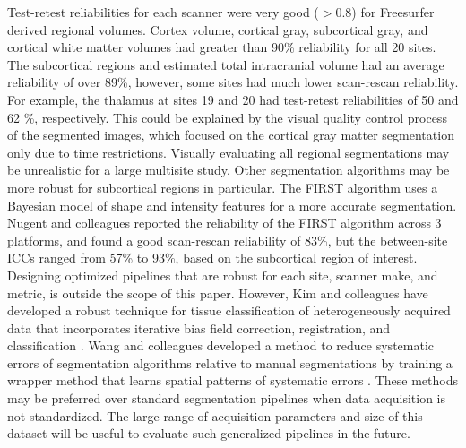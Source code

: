 Test-retest reliabilities for each scanner were very good ($>0.8$) for Freesurfer derived regional volumes. Cortex volume, cortical gray, subcortical gray, and cortical white matter volumes had greater than 90\% reliability for all 20 sites. The subcortical regions and estimated total intracranial volume had an average reliability of over 89\%, however, some sites had much lower scan-rescan reliability. For example, the thalamus at sites 19 and 20 had test-retest reliabilities of 50 and 62 \%, respectively. This could be explained by the visual quality control process of the segmented images, which focused on the cortical gray matter segmentation only due to time restrictions. Visually evaluating all regional segmentations may be unrealistic for a large multisite study. Other segmentation algorithms may be more robust for subcortical regions in particular. The FIRST algorithm \cite{firstcitation} uses a Bayesian model of shape and intensity features for a more accurate segmentation. Nugent and colleagues reported the reliability of the FIRST algorithm across 3 platforms, and found a good scan-rescan reliability of 83\%, but the between-site ICCs ranged from 57\% to 93\%, based on the subcortical region of interest\cite{firstreliability}. Designing optimized pipelines that are robust for each site, scanner make, and metric, is outside the scope of this paper. However, Kim and colleagues have developed a robust technique for tissue classification of heterogeneously acquired data that incorporates iterative bias field correction, registration, and classification \cite{optimize}. Wang and colleagues developed a method to reduce systematic errors of segmentation algorithms relative to manual segmentations by training a wrapper method that learns spatial patterns of systematic errors \cite{Wang2011}. These methods may be preferred over standard segmentation pipelines when data acquisition is not standardized. The large range of acquisition parameters and size of this dataset will be useful to evaluate such generalized pipelines in the future.
